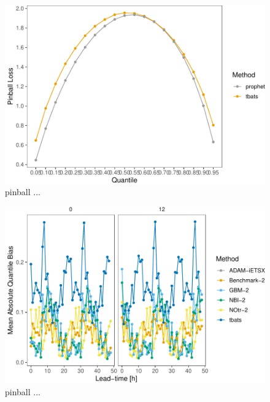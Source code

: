 \documentclass[]{elsarticle} %
\begin{document}
\begin{figure}[H]

{\centering \includegraphics[width=0.9\linewidth]{paper_files/figure-latex/Pinball-1} 

}

\caption{pinball ...}\label{fig:Pinball}
\end{figure}

\begin{figure}[H]

{\centering \includegraphics[width=0.9\linewidth]{paper_files/figure-latex/lead-time-rel-1} 

}

\caption{pinball ...}\label{fig:lead-time-rel}
\end{figure}
\end{document}
